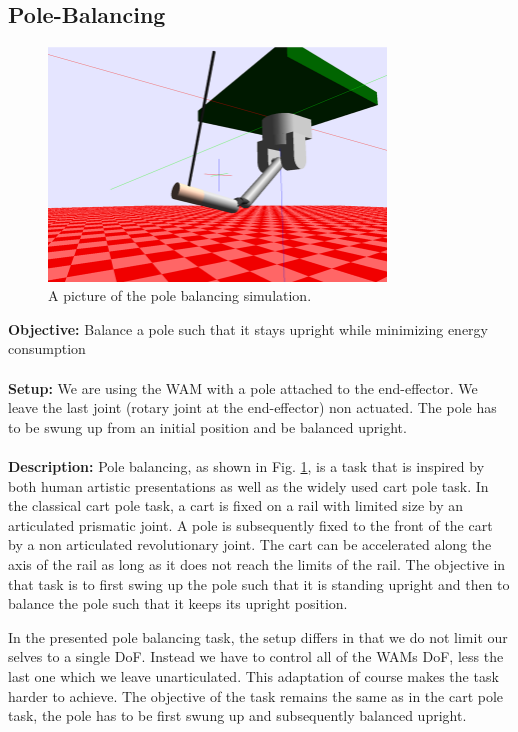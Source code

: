\documentclass[11pt, article, colorback]{article}
\begin{document}
\subsection{Pole-Balancing} \label{sec:poleBalancing}
\begin{figure}
\centering
 \includegraphics[width=0.8\textwidth]{Pics/PoleBalancing.png}
  \caption{A picture of the pole balancing simulation.}
  \label{pic:poleBalancing}
\end{figure}
%
\textbf{Objective:}	 Balance a pole such that it stays upright while minimizing energy consumption \\ \\
%
\textbf{Setup:}	We are using the WAM with a pole attached to the end-effector. 
We leave the last joint (rotary joint at the end-effector) non actuated. The pole 
has to be swung up from an initial position and be balanced upright.  \\ \\
%
\textbf{Description:}
Pole balancing, as shown in Fig.  \ref{pic:poleBalancing}, is a task that is inspired by both human artistic presentations 
as well as the 
widely used cart pole task. In the classical cart pole task, a cart is fixed on a rail with limited size by an articulated prismatic
joint. A pole is subsequently fixed to the front of the cart by a non articulated revolutionary joint. The cart can be accelerated 
along the axis of the rail as long as it does not reach the limits of the rail. The objective in that task is to first swing 
up the pole such that it is standing upright and then to balance the pole such that it keeps its upright position. 

In the presented pole balancing task, the setup differs in that we do not limit our selves to a single DoF. Instead we 
have to control all of the WAMs DoF, less the last one which we leave unarticulated. This adaptation of course makes the task 
harder to achieve. 
The objective of the task remains the same as in the cart pole task, the pole has to be first swung up and subsequently 
balanced upright. 
\end{document}

